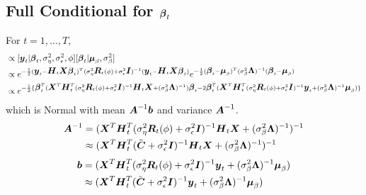 \documentclass[fleqn]{article}
\def\bm#1{\mbox{\boldmath $#1$}}
\begin{document}
\subsection{Full Conditional for $\bm{\beta}_t$}
%
For $t = 1, \ldots, T$,
\begin{align*}
[\bm{\beta}_t | \cdot] & \propto [\bm{y}_t | \bm{\beta}_t, \sigma^2_\eta, \sigma^2_\epsilon, \phi] [\bm{\beta}_t | \bm{\mu}_\beta, \sigma^2_\beta]\\
%
& \propto e^{ - \frac{1} {2} (\bm{y}_t - \bm{H}_t \bm{X} \bm{\beta}_t)^T (\sigma^2_\eta \bm{R}_t(\phi) + \sigma^2_\epsilon \bm{I})^{ - 1} (\bm{y}_t - \bm{H}_t \bm{X} \bm{\beta}_t)} e^{ - \frac{1} {2} (\bm{\beta}_t - \bm{\mu}_\beta)^T (\sigma^2_{\beta} \bm{\Lambda})^{ - 1} (\bm{\beta}_t - \bm{\mu}_\beta)}\\
%
& \propto e^{ - \frac{1} {2} \{\bm{\beta}_t^T (\bm{X}^T \bm{H}_t^T (\sigma^2_\eta \bm{R}_t(\phi) + \sigma^2_\epsilon \bm{I})^{ - 1} \bm{H}_t \bm{X} + (\sigma^2_{\beta} \bm{\Lambda})^{ - 1}) \bm{\beta}_t - 2 \bm{\beta}_t^T (\bm{X}^T \bm{H}_t^T (\sigma^2_\eta \bm{R}_t(\phi) + \sigma^2_\epsilon \bm{I})^{ - 1} \bm{y}_t + (\sigma^2_{\beta} \bm{\Lambda})^{ - 1} \bm{\mu}_\beta) \} }
\end{align*}
%
which is Normal with mean $ \bm{A}^{ - 1} \bm{b}$ and variance $\bm{A}^{ - 1}$.
\begin{align*}
  \bm{A}^{ - 1} & = (\bm{X}^T \bm{H}_t^T (\sigma^2_\eta \bm{R}_t(\phi) + \sigma^2_\epsilon \bm{I})^{ - 1} \bm{H}_t \bm{X} + (\sigma^2_{\beta} \bm{\Lambda})^{ - 1})^{ - 1}\\
  & \approx (\bm{X}^T \bm{H}_t^T (\tilde{\bm{C}} + \sigma^2_\epsilon \bm{I})^{ - 1} \bm{H}_t \bm{X} + (\sigma^2_{\beta} \bm{\Lambda})^{ - 1})^{ - 1}
\end{align*}
\begin{align*}
  \bm{b} & = (\bm{X}^T \bm{H}_t^T (\sigma^2_\eta \bm{R}_t(\phi) + \sigma^2_\epsilon \bm{I})^{ - 1} \bm{y}_t + (\sigma^2_{\beta} \bm{\Lambda})^{ - 1} \bm{\mu}_\beta)\\
  & \approx (\bm{X}^T \bm{H}_t^T (\tilde{\bm{C}} + \sigma^2_\epsilon \bm{I})^{ - 1} \bm{y}_t + (\sigma^2_{\beta} \bm{\Lambda})^{ - 1} \bm{\mu}_\beta)
\end{align*}
%
\end{document}
